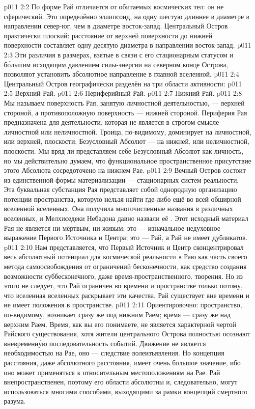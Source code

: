 \vs p011 2:2 \pc По форме Рай отличается от обитаемых космических тел: он не сферический. Это определённо эллипсоид, на одну шестую длиннее в диаметре в направлении север\hyp{}юг, чем в диаметре восток\hyp{}запад. Центральный Остров практически плоский: расстояние от верхней поверхности до нижней поверхности составляет одну десятую диаметра в направлении восток\hyp{}запад.
\vs p011 2:3 Эти различия в размерах, взятые в связи с его стационарным статусом и б\'ольшим исходящим давлением силы\hyp{}энергии на северном конце Острова, позволяют установить абсолютное направление в главной вселенной.
\vs p011 2:4 \pc Центральный Остров географически разделён на три области активности:
\vs p011 2:5 Верхний Рай.
\vs p011 2:6 Периферийный Рай.
\vs p011 2:7 Нижний Рай.
\vs p011 2:8 \pc Мы называем поверхность Рая, занятую личностной деятельностью, --- верхней стороной, а противоположную поверхность --- нижней стороной. Периферия Рая предназначена для деятельности, которая не является в строгом смысле личностной или неличностной. Троица, по\hyp{}видимому, доминирует на личностной, или верхней, плоскости; Безусловный Абсолют --- на нижней, или неличностной, плоскости. Мы вряд ли представляем себе Безусловный Абсолют как личность, но мы действительно думаем, что функциональное пространственное присутствие этого Абсолюта сосредоточено на нижнем Рае.
\vs p011 2:9 \pc Вечный Остров состоит из единственной формы материализации --- стационарных систем реальности. Эта буквальная субстанция Рая представляет собой однородную организацию потенции пространства, которую нельзя найти где\hyp{}либо ещё во всей обширной вселенной вселенных. Она получила многочисленные названия в различных вселенных, и Мелхиседеки Небадона давно назвали её . Этот исходный материал Рая не является ни мёртвым, ни живым; это --- изначальное недуховное выражение Первого Источника и Центра; это --- Рай, а Рай не имеет дубликатов.
\vs p011 2:10 Нам представляется, что Первый Источник и Центр сконцентрировал весь абсолютный потенциал для космической реальности в Раю как часть своего метода самоосвобождения от ограничений бесконечности, как средство создания возможности суббесконечного, даже время\hyp{}пространственного, творения. Но из этого не следует, что Рай ограничен во времени и пространстве только потому, что вселенная вселенных раскрывает эти качества. Рай существует вне времени и не имеет положения в пространстве.
\vs p011 2:11 Ориентировочно: пространство, по\hyp{}видимому, возникает сразу же под нижним Раем; время --- сразу же над верхним Раем. Время, как вы его понимаете, не является характерной чертой Райского существования, хотя жители центрального Острова полностью осознают вневременн\'ую последовательность событий. Движение не является необходимостью на Рае, оно --- следствие волеизъявления. Но концепция расстояния, даже абсолютного расстояния, имеет очень большое значение, ибо оно может применяться к относительным местоположениям на Рае. Рай внепространственен, поэтому его области абсолютны и, следовательно, могут использоваться многими способами, выходящими за рамки концепций смертного разума.
